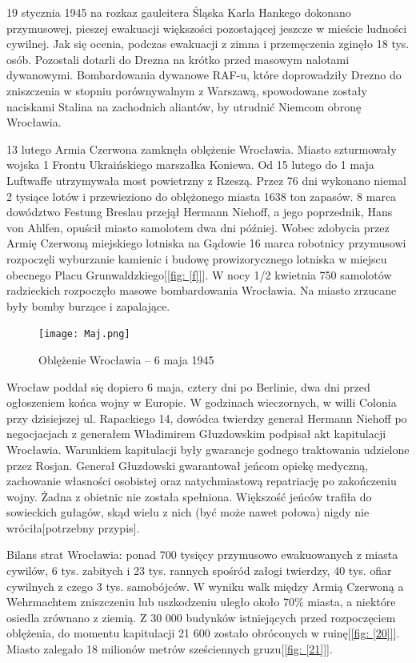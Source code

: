 \documentclass{article}
\begin{document}
19 stycznia 1945 na rozkaz gauleitera Śląska Karla Hankego dokonano przymusowej, pieszej ewakuacji większości pozostającej jeszcze w mieście ludności cywilnej. Jak się ocenia, podczas ewakuacji z zimna i przemęczenia zginęło 18 tys. osób. Pozostali dotarli do Drezna na krótko przed masowym nalotami dywanowymi. Bombardowania dywanowe RAF-u, które doprowadziły Drezno do zniszczenia w stopniu porównywalnym z Warszawą, spowodowane zostały naciskami Stalina na zachodnich aliantów, by utrudnić Niemcom obronę Wrocławia.

13 lutego Armia Czerwona zamknęła oblężenie Wrocławia. Miasto szturmowały wojska 1 Frontu Ukraińskiego marszałka Koniewa. Od 15 lutego do 1 maja Luftwaffe utrzymywała most powietrzny z Rzeszą. Przez 76 dni wykonano niemal 2 tysiące lotów i przewieziono do oblężonego miasta 1638 ton zapasów. 8 marca dowództwo Festung Breslau przejął Hermann Niehoff, a jego poprzednik, Hans von Ahlfen, opuścił miasto samolotem dwa dni później. Wobec zdobycia przez Armię Czerwoną miejskiego lotniska na Gądowie 16 marca robotnicy przymusowi rozpoczęli wyburzanie kamienic i budowę prowizorycznego lotniska w miejscu obecnego Placu Grunwaldzkiego[\ref{fig: [f]}]. W nocy 1/2 kwietnia 750 samolotów radzieckich rozpoczęło masowe bombardowania Wrocławia. Na miasto zrzucane były bomby burzące i zapalające.

\begin{center}
\begin{figure}[h]
	\centering
	\texttt{[image: Maj.png]}
	\caption{Oblężenie Wrocławia – 6 maja 1945}
\end{figure}
\end{center}

Wrocław poddał się dopiero 6 maja, cztery dni po Berlinie, dwa dni przed ogłoszeniem końca wojny w Europie. W godzinach wieczornych, w willi Colonia przy dzisiejszej ul. Rapackiego 14, dowódca twierdzy generał Hermann Niehoff po negocjacjach z generałem Władimirem Głuzdowskim podpisał akt kapitulacji Wrocławia. Warunkiem kapitulacji były gwarancje godnego traktowania udzielone przez Rosjan. Generał Głuzdowski gwarantował jeńcom opiekę medyczną, zachowanie własności osobistej oraz natychmiastową repatriację po zakończeniu wojny. Żadna z obietnic nie została spełniona. Większość jeńców trafiła do sowieckich gułagów, skąd wielu z nich (być może nawet połowa) nigdy nie wróciła[potrzebny przypis].

Bilans strat Wrocławia: ponad 700 tysięcy przymusowo ewakuowanych z miasta cywilów, 6 tys. zabitych i 23 tys. rannych spośród załogi twierdzy, 40 tys. ofiar cywilnych z czego 3 tys. samobójców. W wyniku walk między Armią Czerwoną a Wehrmachtem zniszczeniu lub uszkodzeniu uległo około 70\% miasta, a niektóre osiedla zrównano z ziemią. Z 30 000 budynków istniejących przed rozpoczęciem oblężenia, do momentu kapitulacji 21 600 zostało obróconych w ruinę[\ref{fig: [20]}]. Miasto zalegało 18 milionów metrów sześciennych gruzu[\ref{fig: [21]}].
\end{document}
